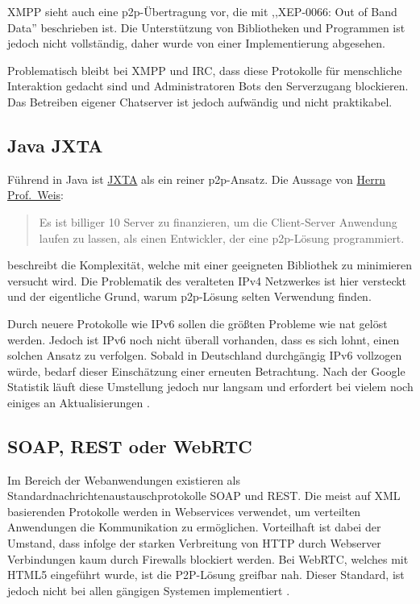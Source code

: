 \documentclass[oneside, ngerman, toc=bibliography,bibliography=totoc,listof=entryprefix, open=right,numbers=noenddot,fontsize=12pt]{scrbook}
\begin{document}
XMPP sieht auch eine \acrshort{p2p}-Übertragung vor, die mit ,,XEP-0066: Out of Band Data''  beschrieben ist. Die Unterstützung von Bibliotheken und Programmen ist jedoch nicht vollständig, daher wurde von einer Implementierung abgesehen.

Problematisch bleibt bei XMPP und IRC, dass diese Protokolle für menschliche Interaktion gedacht sind und Administratoren Bots den Serverzugang blockieren. Das Betreiben eigener Chatserver ist jedoch aufwändig und nicht praktikabel.

 
\subsection{Java JXTA}
Führend in Java ist \href{https://jxta.kenai.com/}{{JXTA}} als ein reiner \acrshort{p2p}-Ansatz. Die Aussage von \href{http://www.vs.uni-due.de/}{Herrn Prof.\ Weis}:

\begin{quote}
Es ist billiger 10 Server zu finanzieren, um die Client-Server Anwendung laufen zu lassen, als einen Entwickler, der eine \acrshort{p2p}-Lösung programmiert.
\end{quote}
beschreibt die Komplexität, welche mit einer geeigneten Bibliothek zu minimieren versucht wird.
Die Problematik des veralteten IPv4 Netzwerkes ist hier versteckt und der eigentliche Grund, warum \acrshort{p2p}-Lösung selten Verwendung finden.

Durch neuere Protokolle wie IPv6 sollen die größten Probleme wie \acrshort{nat} gelöst werden.
Jedoch ist IPv6 noch nicht überall vorhanden, dass es sich lohnt, einen solchen Ansatz zu verfolgen.
Sobald in Deutschland durchgängig IPv6 vollzogen würde, bedarf dieser Einschätzung einer erneuten Betrachtung. Nach der Google Statistik läuft diese Umstellung jedoch nur langsam und erfordert bei vielem noch einiges an Aktualisierungen \cite{gstat}. 


\subsection{SOAP, REST oder WebRTC}
Im Bereich der Webanwendungen existieren als Standardnachrichtenaustauschprotokolle {SOAP} und {REST}.
Die meist auf {XML} basierenden Protokolle werden in Webservices verwendet, um verteilten Anwendungen die Kommunikation zu ermöglichen.
Vorteilhaft ist dabei der Umstand, dass infolge der starken Verbreitung von {HTTP} durch Webserver Verbindungen kaum durch Firewalls blockiert werden. 
Bei {WebRTC}, welches mit {HTML5} eingeführt wurde, ist die P2P-Lösung greifbar nah. Dieser Standard, ist jedoch nicht bei allen gängigen Systemen implementiert \cite{cani}.
\end{document}
